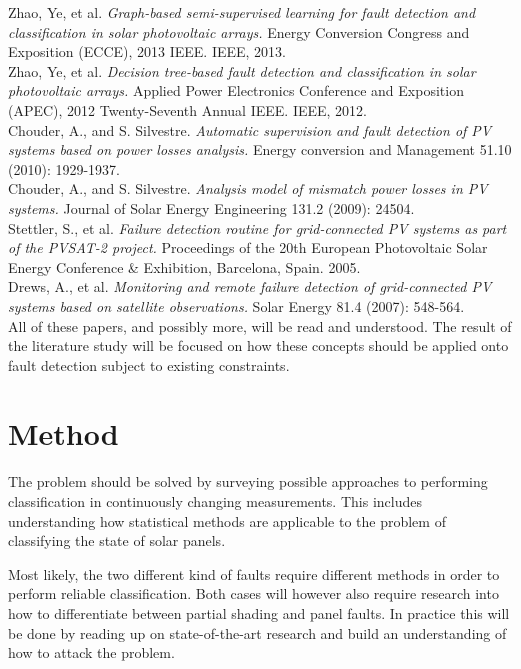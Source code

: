 \documentclass[a4paper,11pt]{article}
\begin{document}
\noindent
Zhao, Ye, et al. \emph{Graph-based semi-supervised learning for fault detection and classification in solar photovoltaic arrays.} Energy Conversion Congress and Exposition (ECCE), 2013 IEEE. IEEE, 2013.\\

\noindent
Zhao, Ye, et al. \emph{Decision tree-based fault detection and classification in solar photovoltaic arrays.} Applied Power Electronics Conference and Exposition (APEC), 2012 Twenty-Seventh Annual IEEE. IEEE, 2012.\\

\noindent
Chouder, A., and S. Silvestre. \emph{Automatic supervision and fault detection of PV systems based on power losses analysis.} Energy conversion and Management 51.10 (2010): 1929-1937.\\

\noindent
Chouder, A., and S. Silvestre. \emph{Analysis model of mismatch power losses in PV systems.} Journal of Solar Energy Engineering 131.2 (2009): 24504.\\

\noindent
Stettler, S., et al. \emph{Failure detection routine for grid-connected PV systems as part of the PVSAT-2 project.} Proceedings of the 20th European Photovoltaic Solar Energy Conference \& Exhibition, Barcelona, Spain. 2005.\\

\noindent
Drews, A., et al. \emph{Monitoring and remote failure detection of grid-connected PV systems based on satellite observations.} Solar Energy 81.4 (2007): 548-564.\\

All of these papers, and possibly more, will be read and understood.
The result of the literature study will be focused on how these concepts should be applied onto fault detection subject to existing constraints.

\section*{Method}
The problem should be solved by surveying possible approaches to performing classification in continuously changing measurements.
This includes understanding how statistical methods are applicable to the problem of classifying the state of solar panels.

Most likely, the two different kind of faults require different methods in order to perform reliable classification.
Both cases will however also require research into how to differentiate between partial shading and panel faults.
In practice this will be done by reading up on state-of-the-art research and build an understanding of how to attack the problem.
\end{document}
